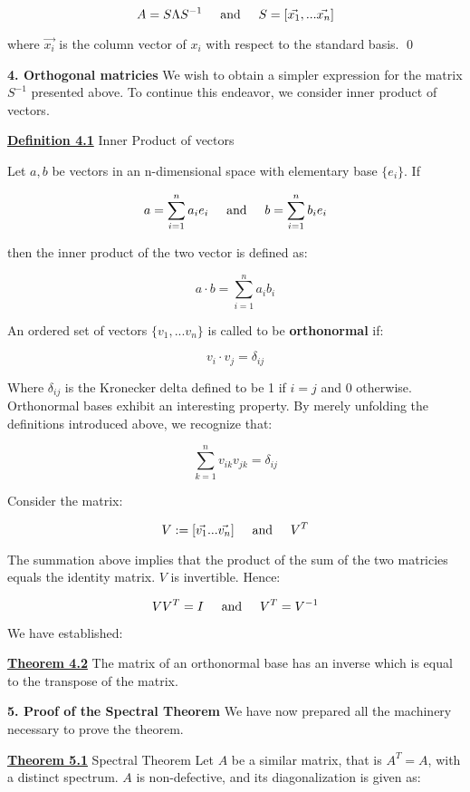 \documentclass{article}
\newcommand{\new}[1]{
    \vspace{2mm}
    \noindent
    \textbf{
    \underline{#1}}
}
\newcommand{\textAnd}{
    {
        \hspace{5mm}
        \textrm{and}
        \hspace{5mm}
    }
}
\begin{document}
\[
    A = S \Lambda S^{-1}
    \textAnd 
    S = [\vec{x_1}, ... \vec{x_n}]
\]

where $\vec{x_i}$ is the column vector of $x_i$ with respect to 
the standard basis. \qed

\vspace{15mm}


\textbf{4. Orthogonal matricies}
We wish to obtain a simpler expression for the matrix $S^{-1}$ 
presented above. To continue this endeavor, we consider inner 
product of vectors. 

\new{Definition 4.1} Inner Product of vectors 

Let $a, b$ be vectors in an n-dimensional space with 
elementary base $\{e_i\}$. If 

\[
    a = \sum_{i = 1}^{n} a_ie_i \textAnd 
    b = \sum_{i = 1}^{n} b_ie_i 
\]

then the inner product of the two vector is defined as:

\[
    a\cdot b = \sum_{i = 1}^{n} a_ib_i
\]

An ordered set of vectors $\{v_1, ... v_n\}$ 
is called to be \textbf{orthonormal} if:

\[
    v_i\cdot v_j = \delta _{ij}
\]

Where $\delta_{ij}$ is the Kronecker delta defined to 
be 1 if $i = j$ and 0 otherwise. Orthonormal bases 
exhibit an interesting property. By merely unfolding 
the definitions introduced above, we recognize that:

\[
    \sum_{k = 1}^{n}v_{ik}v_{jk} = \delta_{ij}
\]

Consider the matrix:

\[
    V:= [\vec{v_1} ... \vec{v_n}] \textAnd V^T
\]

The summation above implies that the product of the sum of the 
two matricies equals the identity matrix. $V$ is invertible. Hence:

\[
    VV^T = I \textAnd V^T = V^{-1}
\]

We have established:

\new{Theorem 4.2} The matrix of an orthonormal base has an inverse 
which is equal to the transpose of the matrix. 

\vspace{15mm}

\textbf{5. Proof of the Spectral Theorem}
We have now prepared all the machinery necessary to prove the theorem. 

\new{Theorem 5.1} Spectral Theorem 
Let $A$ be a similar matrix, that is $A^T = A$, with a distinct spectrum. 
$A$ is non-defective, and its diagonalization is given as:
\end{document}
